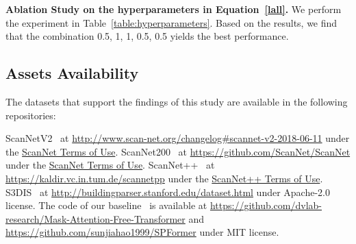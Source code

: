 \textbf{Ablation Study on the hyperparameters in Equation~\ref{lall}.} We perform the experiment in Table~\ref{table:hyperparameters}. 
%
Based on the results, we find that the combination 0.5, 1, 1, 0.5, 0.5 yields the best performance.
\begin{table}[!htbp]
  \begin{center}
    \footnotesize
    \caption{\textbf{Ablation Study on the hyperparameters in Equation~\ref{lall} on ScanNetV2 validation set.}}
    \label{table:hyperparameters}

  \end{center}
\end{table}

\subsection{Assets Availability}
\label{asset}
The datasets that support the findings of this study are available in the following repositories: 

ScanNetV2~\cite{dai2017scannet} at \url{http://www.scan-net.org/changelog#scannet-v2-2018-06-11} under the \href{http://kaldir.vc.in.tum.de/scannet/ScanNet_TOS.pdf}{ScanNet Terms of Use}.
%
ScanNet200~\cite{rozenberszki2022language} at \url{https://github.com/ScanNet/ScanNet} under the \href{http://kaldir.vc.in.tum.de/scannet/ScanNet_TOS.pdf}{ScanNet Terms of Use}.
%
ScanNet++~\cite{yeshwanth2023scannet++} at \url{https://kaldir.vc.in.tum.de/scannetpp} under the \href{https://kaldir.vc.in.tum.de/scannetpp/static/scannetpp-terms-of-use.pdf}{ScanNet++ Terms of Use}.
%
S3DIS~\cite{armeni20163d} at \url{http://buildingparser.stanford.edu/dataset.html} under Apache-2.0 license.
%
The code of our baseline~\cite{lai2023mask,sun2023superpoint} is available at \url{https://github.com/dvlab-research/Mask-Attention-Free-Transformer} and \url{https://github.com/sunjiahao1999/SPFormer} under MIT license.

